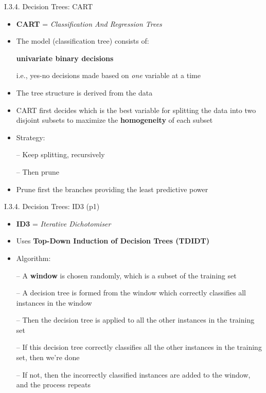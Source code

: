 \documentclass[handout]{beamer}
\newcommand{\strong}[1]{\textbf{\color{teal} #1}}
\newcommand{\stronger}[1]{\textbf{\color{purple} #1}}
\begin{document}
\begin{frame}{I.3.4. Decision Trees: CART}
\begin{itemize}
\item \stronger{CART} = \emph{Classification And Regression Trees}~\cite{breiman-cart:1984}
\item The model (classification tree) consists of:
\item[] \strong{univariate binary decisions}
\item[] i.e., yes-no decisions made based on \emph{one} variable at a time
\item The tree structure is derived from the data
\item CART first decides which is the best variable for splitting the data into two disjoint subsets to maximize the \strong{homogeneity} of each subset
\item Strategy:
\item[--] Keep splitting, recursively
\item[--] Then prune
\item Prune first the branches providing the least predictive power
\end{itemize}
\end{frame}
\begin{frame}{I.3.4. Decision Trees: ID3 (p1)}
\begin{itemize}
\item \stronger{ID3} = \emph{Iterative Dichotomiser}~\cite{quinlan-id3:1986}
\item Uses \strong{Top-Down Induction of Decision Trees (TDIDT)}
\item Algorithm:
\item[--] A \strong{window} is chosen randomly, which is a subset of the training set
\item[--] A decision tree is formed from the window which correctly classifies all instances in the window
\item[--] Then the decision tree is applied to all the other instances in the training set
\item[--] If this decision tree correctly classifies all the other instances in the training set, then we're done
\item[--] If not, then the incorrectly classified instances are added to the window, and the process repeats
\end{itemize}
\end{frame}
\end{document}
